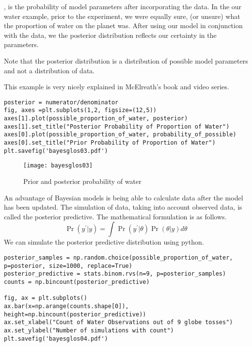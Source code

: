 , is the probability of model parameters after incorporating the data. In the our water example, prior to the experiment, we were equally sure, (or unsure) what the proportion of water on the planet was. After using our model in conjunction with the data, we the posterior distribution reflects our certainty in the parameters.

Note that the posterior distribution is a distribution of possible model parameters and not a distribution of data.

This example is very nicely explained in McElreath's book \cite[Chapter 2]{McElreath2015} and video series.

\begin{lstlisting}
posterior = numerator/denominator
fig, axes =plt.subplots(1,2, figsize=(12,5))
axes[1].plot(possible_proportion_of_water, posterior)
axes[1].set_title("Posterior Probability of Proportion of Water")
axes[0].plot(possible_proportion_of_water, probability_of_possible) 
axes[0].set_title("Prior Probability of Proportion of Water")
plt.savefig('bayesglos03.pdf')
\end{lstlisting}
\begin{figure*}[h]
    \texttt{[image: bayesglos03]}
    \caption{Prior and posterior probability of water}
    \end{figure*}

An advantage of Bayesian models is being able to calculate data after the model has been updated. The simulation of data, taking into account observed data, is called the posterior predictive. The mathematical formulation is as follows.
\begin{equation}
    \operatorname{Pr}\left(y^{\prime} | y\right)=\int \operatorname{Pr}\left(y^{\prime} | \theta\right) \operatorname{Pr}(\theta | y) d \theta
    \end{equation}
We can simulate the posterior predictive distribution using python. 
\begin{lstlisting}
posterior_samples = np.random.choice(possible_proportion_of_water, p=posterior, size=1000, replace=True)
posterior_predictive = stats.binom.rvs(n=9, p=posterior_samples)
counts = np.bincount(posterior_predictive)

fig, ax = plt.subplots()
ax.bar(x=np.arange(counts.shape[0]), height=np.bincount(posterior_predictive))
ax.set_xlabel("Count of Water Observations out of 9 globe tosses")
ax.set_ylabel("Number of simulations with count")
plt.savefig('bayesglos04.pdf')
\end{lstlisting}

